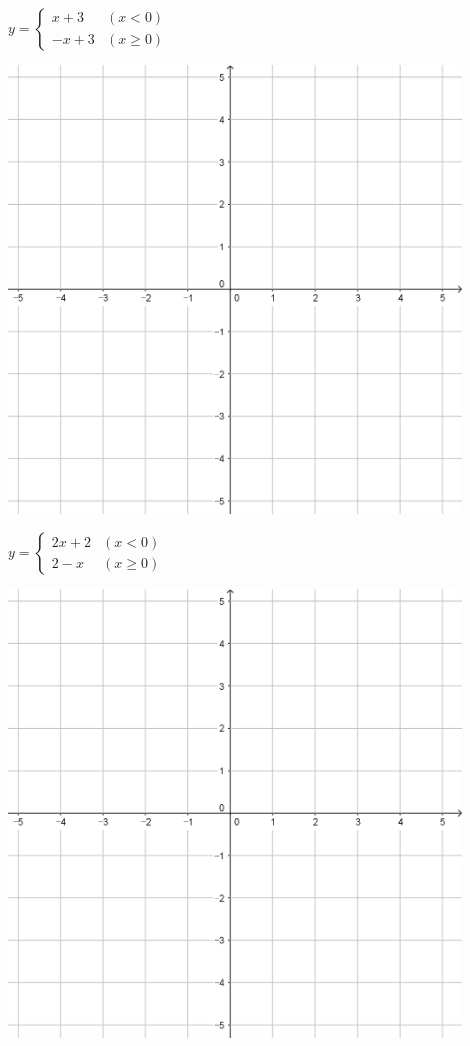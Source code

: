 \documentclass[a4paper]{oblivoir}
\begin{document}
\clearpage
\begin{minipage}{0.45\textwidth}\centering
\(y=\begin{cases}x+3&(x<0)\\-x+3&(x\ge0)\end{cases}\)
\par\bigskip\includegraphics[width=0.9\textwidth]{55}
\end{minipage}
\begin{minipage}{0.45\textwidth}\centering
\(y=\begin{cases}2x+2&(x<0)\\2-x&(x\ge0)\end{cases}\)
\par\bigskip\includegraphics[width=0.9\textwidth]{55}
\end{minipage}\bigskip\bigskip\par
\end{document}
